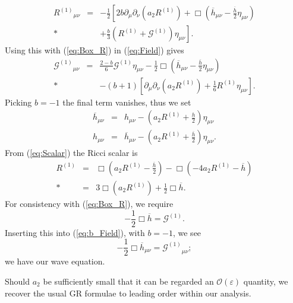 \documentclass[aps,prd,amsfonts,amssymb,amsmath,nofootinbib,reprint,showpacs]{revtex4-1}
\newcommand{\eqnref}[1]{(\ref{eq:#1})}
\newcommand{\recip}[1]{\ensuremath{\frac{1}{#1}}}
\newcommand{\order}[1]{\ensuremath{\mathcal{O}({#1})}}
\begin{document}
\begin{eqnarray}
{R^{(1)}}_{\mu\nu} & = & -\frac{1}{2}\left[2b \partial_\mu\partial_\nu(a_2  R^{(1)}) + \Box\left(\overline{h}_{\mu\nu} -\frac{\overline{h}}{2}\eta_{\mu\nu}\right) \right. \nonumber \\*
 & &  +\left . \frac{b}{3}(R^{(1)} + \mathcal{G}^{(1)})\eta_{\mu\nu}\right].
\label{eq:new_Ricci}
\end{eqnarray}
Using this with \eqnref{Box_R} in \eqnref{Field} gives
\begin{eqnarray}
{\mathcal{G}^{(1)}}_{\mu\nu} & = & \frac{2 - b}{6}\mathcal{G}^{(1)}\eta_{\mu\nu} -\frac{1}{2}\Box\left(\overline{h}_{\mu\nu} - \frac{\overline{h}}{2}\eta_{\mu\nu}\right) \nonumber \\*
 & & - (b + 1)\left[\partial_\mu\partial_\nu(a_2 R^{(1)}) + \recip{6}R^{(1)}\eta_{\mu\nu}\right].
\label{eq:b_Field}
\end{eqnarray}
Picking $b = -1$ the final term vanishes, thus we set~\cite{Corda2008, Capozziello2008}
\begin{subequations}
\begin{eqnarray}
\label{eq:hbar_metric}
\overline{h}_{\mu\nu} & = & h_{\mu\nu} - \left(a_2 R^{(1)} + \frac{h}{2}\right)\eta_{\mu\nu}\\
h_{\mu\nu} & = & \overline{h}_{\mu\nu} - \left(a_2 R^{(1)} + \frac{\overline{h}}{2}\right)\eta_{\mu\nu}.
\label{eq:h_metric}
\end{eqnarray}
\end{subequations}
From \eqnref{Scalar} the Ricci scalar is 
\begin{eqnarray}
R^{(1)} & = & \Box \left(a_2 R^{(1)} -\frac{\overline{h}}{2}\right) - \Box (-4 a_2 R^{(1)} - \overline{h}) \nonumber \\*
 & = & 3 \Box(a_2 R^{(1)}) + \frac{1}{2}\Box \overline{h}.
\label{eq:Ricci_Box_h}
\end{eqnarray}
For consistency with \eqnref{Box_R}, we require
\begin{equation}
-\recip{2}\Box \overline{h} = \mathcal{G}^{(1)}.
\label{eq:Box_h}
\end{equation}
Inserting this into \eqnref{b_Field}, with $b = -1$, we see
\begin{equation}
-\recip{2}\Box \overline{h}_{\mu\nu} = {\mathcal{G}^{(1)}}_{\mu\nu};
\label{eq:Box_hmunu}
\end{equation}
we have our wave equation.

Should $a_2$ be sufficiently small that it can be regarded an $\order{\varepsilon}$ quantity, we recover the usual GR formulae to leading order within our analysis.
\end{document}
